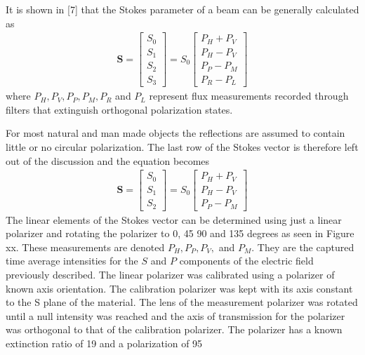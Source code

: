 It is shown in [7] that the Stokes parameter of a beam can be generally calculated as
%
\begin{align}
    \mathbf{S} =
    \begin{bmatrix}
        S_0 \\
        S_1 \\
        S_2 \\
        S_3
    \end{bmatrix}
    =
    S_0
    \begin{bmatrix}
        P_H + P_V \\
        P_H - P_V \\
        P_P - P_M \\
        P_R - P_L
    \end{bmatrix}
\end{align}
%
where $P_H, P_V, P_P, P_M, P_R$ and $P_L$ represent flux measurements recorded through filters that extinguish orthogonal polarization states.

For most natural and man made objects the reflections are assumed to contain little or no circular polarization. The last row of the Stokes vector is therefore left out of the discussion and the equation becomes
%
\begin{align}
    \mathbf{S} =
    \begin{bmatrix}
        S_0 \\
        S_1 \\
        S_2
    \end{bmatrix}
    =
    S_0
    \begin{bmatrix}
        P_H + P_V \\
        P_H - P_V \\
        P_P - P_M
    \end{bmatrix}
\end{align}
%
The linear elements of the Stokes vector can be determined using just a linear polarizer and rotating the polarizer to 0, 45 90 and 135 degrees as seen in Figure xx.  These measurements are denoted $P_H, P_P, P_V,$ and $P_M$. They are the captured time average intensities for the $S$ and $P$ components of the electric field previously described.
%
%
The linear polarizer was calibrated using a polarizer of known axis orientation.  The calibration polarizer was kept with its axis constant to the S plane of the material.  The lens of the measurement polarizer was rotated until a null intensity was reached and the axis of transmission for the polarizer was orthogonal to that of the calibration polarizer.  The polarizer has a known extinction ratio of 19 and a polarization of 95%

